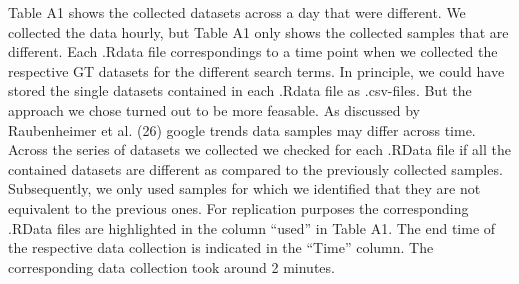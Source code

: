 \documentclass[
  letterpaper,
  DIV=11,
  numbers=noendperiod]{scrartcl}
\begin{document}
Table A1 shows the collected datasets across a day that were different.
We collected the data hourly, but Table A1 only shows the collected
samples that are different. Each .Rdata file correspondings to a time
point when we collected the respective GT datasets for the different
search terms. In principle, we could have stored the single datasets
contained in each .Rdata file as .csv-files. But the approach we chose
turned out to be more feasable. As discussed by Raubenheimer et al. (26)
google trends data samples may differ across time. Across the series of
datasets we collected we checked for each .RData file if all the
contained datasets are different as compared to the previously collected
samples. Subsequently, we only used samples for which we identified that
they are not equivalent to the previous ones. For replication purposes
the corresponding .RData files are highlighted in the column ``used'' in
Table A1. The end time of the respective data collection is indicated in
the ``Time'' column. The corresponding data collection took around 2
minutes.
\end{document}
